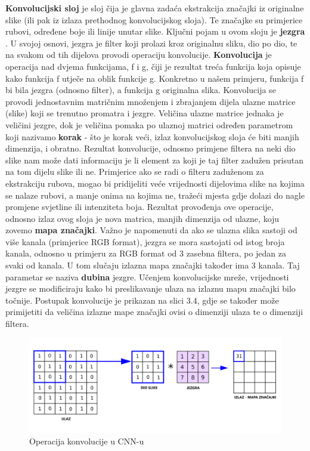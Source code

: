 \noindent \textbf{Konvolucijski sloj}  je sloj čija je glavna zadaća ekstrakcija značajki iz originalne slike (ili pak iz izlaza prethodnog konvolucijskog sloja). Te značajke su primjerice rubovi, određene boje ili linije unutar slike. Ključni pojam u ovom sloju je \textbf{jezgra} . U svojoj osnovi, jezgra je filter koji prolazi kroz originalnu sliku, dio po dio, te na svakom od tih dijelova provodi operaciju konvolucije. \textbf{Konvolucija} je operacija nad dvjema funkcijama, f i g, čiji je rezultat treća funkcija koja opisuje kako funkcija f utječe na oblik funkcije g. \citep{convolutionOperationsCNN}  Konkretno u našem primjeru, funkcija f bi bila jezgra (odnosno filter), a funkcija g originalna slika. Konvolucija se provodi jednostavnim matričnim množenjem i zbrajanjem dijela ulazne matrice (slike) koji se trenutno promatra i jezgre. Veličina ulazne matrice jednaka je veličini jezgre, dok je veličina pomaka po ulaznoj matrici određen parametrom koji nazivamo \textbf{korak}  - što je korak veći, izlaz konvolucijskog sloja će biti manjih dimenzija, i obratno. Rezultat konvolucije, odnosno primjene filtera na neki dio slike nam može dati informaciju je li element za koji je taj filter zadužen prisutan na tom dijelu slike ili ne. Primjerice ako se radi o filteru zaduženom za ekstrakciju rubova, mogao bi pridijeliti veće vrijednosti dijelovima slike na kojima se nalaze rubovi, a manje onima na kojima ne, tražeći mjesta gdje dolazi do nagle promjene svjetline ili intenziteta boja. Rezultat provođenja ove operacije, odnosno izlaz ovog sloja je nova matrica, manjih dimenzija od ulazne, koju zovemo  \textbf{mapa značajki}. Važno je napomenuti da ako se ulazna slika sastoji od više kanala (primjerice RGB format), jezgra se mora sastojati od istog broja kanala, odnosno u primjeru za RGB format od 3 zasebna filtera, po jedan za svaki od kanala. U tom slučaju izlazna mapa značajki također ima 3 kanala. Taj parametar se naziva \textbf{dubina} jezgre. Učenjem konvolucijske mreže, vrijednosti jezgre se modificiraju kako bi preslikavanje ulaza na izlaznu mapu značajki bilo točnije. Postupak konvolucije je prikazan na slici 3.4, gdje se također može primijetiti da veličina izlazne mape značajki ovisi o dimenziji ulaza te o dimenziji filtera.\\

\begin{figure}[htb]
\centering
\includegraphics[width=15cm]{slike/kernelCNN.png}
\caption{Operacija konvolucije u CNN-u \citep{CNNAnnReynolds}}
\label{fig:fer-logo}
\end{figure}
\textbf{}


